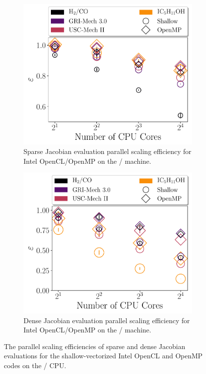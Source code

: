\documentclass[12pt,number,sort&compress,preprint]{elsarticle}
\begin{document}
\begin{figure}[htbp]
   \centering
  \begin{subfigure}[t]{0.48\linewidth}
      \includegraphics[width=\textwidth]{sparse_jac_scaling.pdf}
      \caption{Sparse Jacobian evaluation parallel scaling efficiency for Intel OpenCL\slash OpenMP on the \avx/ machine.}
      \label{F:sparse_jac_scaling}
  \end{subfigure}
  \hfill
  \begin{subfigure}[t]{0.48\linewidth}
      \includegraphics[width=\textwidth]{dense_jac_scaling.pdf}
      \caption{Dense Jacobian evaluation parallel scaling efficiency for Intel OpenCL\slash OpenMP on the \avx/ machine.}
      \label{F:dense_jac_scaling}
  \end{subfigure}
  \caption{The parallel scaling efficiencies of sparse and dense Jacobian evaluations for the shallow-vectorized Intel OpenCL and OpenMP codes on the \avx/ CPU.}
\end{figure}
\end{document}
